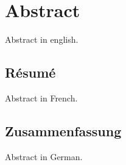 

\cleardoublepage
\chapter*{Abstract}
Abstract in english.



\begin{otherlanguage}{french}
\cleardoublepage
\chapter*{Résumé}
Abstract in French.
\end{otherlanguage}




\begin{otherlanguage}{german}
\cleardoublepage
\chapter*{Zusammenfassung}
Abstract in German.
\end{otherlanguage}



